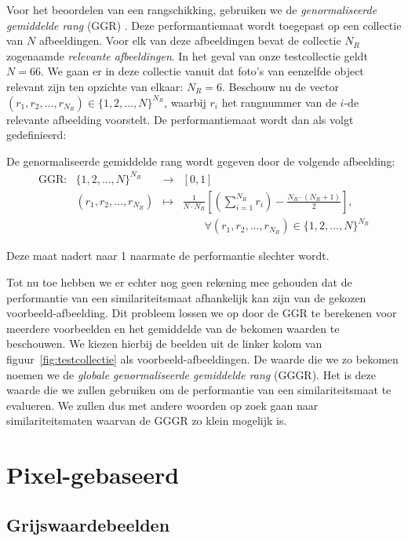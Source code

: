 Voor het beoordelen van een rangschikking, gebruiken we de \emph{genormaliseerde gemiddelde rang} 
(GGR) \cite{muller:perf_eval}. Deze performantiemaat wordt toegepast op een collectie
van $N$ afbeeldingen. Voor elk van deze afbeeldingen bevat de collectie
$N_R$ zogenaamde \emph{relevante afbeeldingen}. In het geval van onze testcollectie geldt $N = 66$.
We gaan er in deze collectie vanuit dat foto's van eenzelfde object relevant zijn ten opzichte
van elkaar: $N_R = 6$. Beschouw nu de vector 
$(r_1,r_2,\ldots,r_{N_R}) \in \{1,2,\ldots,N\}^{N_R}$, waarbij $r_i$ het
rangnummer van de $i$-de relevante afbeelding voorstelt. De performantiemaat
wordt dan als volgt gedefinieerd:
\begin{definitie}
De genormaliseerde gemiddelde rang wordt gegeven door de volgende afbeelding:
$$
\begin{array}{lrcl}
\textrm{GGR}: 	& \{1,2,\ldots,N\}^{N_R} & \to 	& [0,1] \\
		& (r_1,r_2,\ldots,r_{N_R}) & \mapsto &
	{\displaystyle\frac{1}{N \cdot N_R}\left[ \left(\sum_{i=1}^{N_R}r_i\right) - \frac{N_R \cdot (N_R + 1)}{2} \right]},\\
	& & & \qquad \forall (r_1, r_2, ..., r_{N_R}) \in \{1,2,\ldots,N\}^{N_R}
\end{array}
$$
\end{definitie}
\noindent
Deze maat nadert naar 1 naarmate de performantie slechter wordt.

Tot nu toe hebben we er echter nog geen rekening mee gehouden dat de performantie van
een similariteitsmaat afhankelijk kan zijn van de gekozen voorbeeld-afbeelding. Dit probleem lossen we
op door de GGR te berekenen voor meerdere voorbeelden en het gemiddelde van de bekomen waarden
te beschouwen. We kiezen hierbij de beelden uit de linker kolom van 
figuur~\ref{fig:testcollectie} als voorbeeld-afbeeldingen. De waarde die we zo bekomen noemen we de
\emph{globale genormaliseerde gemiddelde rang} (GGGR). Het is deze waarde die we zullen gebruiken
om de performantie van een similariteitsmaat te evalueren. We zullen dus met andere woorden op
zoek gaan naar similariteitsmaten waarvan de GGGR zo klein mogelijk is.


\section{Pixel-gebaseerd}

\subsection{Grijswaardebeelden}


